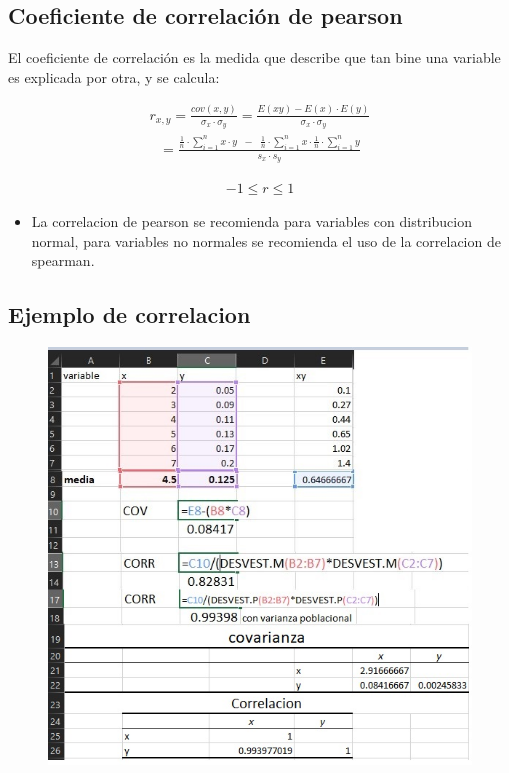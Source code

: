 \documentclass[twocolumn]{article}
\providecommand{\tightlist}{%
  \setlength{\itemsep}{0pt}\setlength{\parskip}{0pt}}
\begin{document}
\subsection{Coeficiente de correlación de
pearson}\label{coeficiente-de-correlaciuxf3n-de-pearson}

El coeficiente de correlación es la medida que describe que tan bine una
variable es explicada por otra, y se calcula:

\[
\begin{array}{c}
r_{x,y} = \frac{cov(x,y)}{\sigma_x \cdot \sigma_y} = \frac{E(xy)- E(x) \cdot E(y)}{\sigma_x \cdot \sigma_y} 
\end{array}
\] \[
\begin{array}{c}
= \frac{\frac{1}{n} \cdot \sum_{i=1}^n x \cdot y\;\; - \;\;\frac{1}{n} \cdot \sum_{i=1}^n x \cdot \frac{1}{n} \cdot \sum_{i=1}^n y }{s_x \cdot s_y}
\end{array}
\]

\[
\begin{array}{c}
-1 \leq r \leq 1
\end{array}
\]

\begin{itemize}
\tightlist
\item
  La correlacion de pearson se recomienda para variables con
  distribucion normal, para variables no normales se recomienda el uso
  de la correlacion de spearman.
\end{itemize}

\subsection{Ejemplo de correlacion}\label{ejemplo-de-correlacion}

\begin{figure}
\centering
\includegraphics{./img/corrExcel.jpg}
\caption{}
\end{figure}
\end{document}
